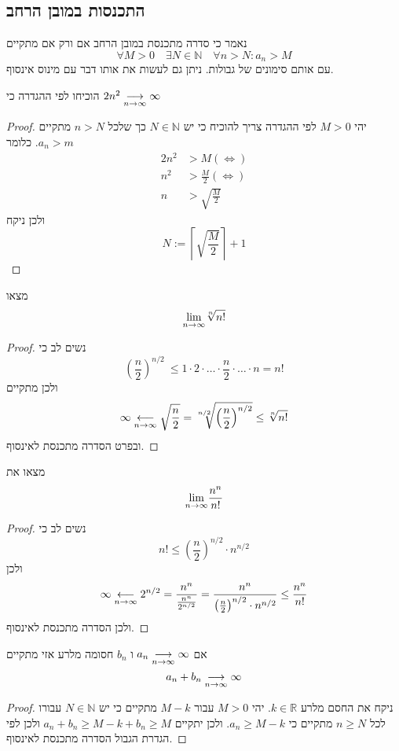 \documentclass{article}
\begin{document}
\subsection*{התכנסות במובן הרחב}
\begin{definition}
נאמר כי סדרה מתכנסת במובן הרחב אם ורק אם מתקיים 
\[\forall M>0 \quad \exists N\in\mathbb{N}\quad \forall n>N: a_n>M\]
עם אותם סימונים של גבולות. ניתן גם לעשות את אותו דבר עם מינוס אינסוף.
\end{definition}
\begin{example}
הוכיחו לפי ההגדרה כי 
$2n^2\underset{n\rightarrow\infty}{\longrightarrow} \infty$
\end{example}

\begin{proof}
יהי 
$M>0$
לפי ההגדרה צריך להוכיח כי יש 
$N\in\mathbb{N}$
כך שלכל 
$n>N$
מתקיים 
$a_n>m$.
כלומר 
\begin{align*}
2n^2&>M  \left(\Longleftrightarrow\right)\\
n^2&>\frac{M}{2}  \left(\Longleftrightarrow\right)\\
n&> \sqrt{\frac{M}{2}} 
\end{align*}
ולכן ניקח 
\[N:=\left\lceil\sqrt{\frac{M}{2}} \right\rceil +1\]
\end{proof}

\begin{comment}
שימו לב כי אם 
$a_n$ 
סדרה מתכנסת לאינסוף ומתקיים כי 
$a_n\leq b_n$
אז גם 
$b_n$
מתכנסת לאינסוף.
\end{comment}
\begin{example}
מצאו 
\[\underset{n\rightarrow\infty}{\lim} \sqrt[n]{n!}\]
\end{example}
\begin{proof}
נשים לב כי 
\[\left(\frac{n}{2}\right)^{n/2}\ \leq 1\cdot 2\cdot \dots\cdot \frac{n}{2}\cdot \dots\cdot n= n!\]
ולכן מתקיים
\[\infty\underset{n\rightarrow\infty}{\longleftarrow} \sqrt{\frac{n}{2}}= \sqrt[n/2]{\left(\frac{n}{2}\right)^{n/2}}\leq \sqrt[n]{n!}\]
ובפרט הסדרה מתכנסת לאינסוף.
\end{proof}
\begin{example}
מצאו את 
\[\underset{n\rightarrow\infty}{\lim} \frac{n^n}{n!}\]
\end{example}
\begin{proof}
נשים לב כי
\[n!\leq \left(\frac{n}{2}\right)^{n/2}\cdot n ^{n/2}\]
ולכן 
\[\infty\underset{n\rightarrow\infty}{\longleftarrow} 2^{n/2} = \frac{n^n}{\frac{n^n}{2^{n/2}}} = \frac{n^n}{\left(\frac{n}{2}\right)^{n/2}\cdot n^{n/2}} \leq \frac{n^n}{n!} \]
ולכן הסדרה מתכנסת לאינסוף. 
\end{proof}

\begin{claim}
אם 
$a_n\underset{n\rightarrow\infty}{\longrightarrow} \infty$
ו 
$b_n$
חסומה מלרע אזי מתקיים 
\[a_n+b_n\underset{n\rightarrow\infty}{\longrightarrow}\infty\]
\end{claim}
\begin{proof}
ניקח את החסם מלרע 
$k\in\mathbb{R}$.
יהי 
$M>0$
עבור 
$M-k$
מתקיים כי יש 
$N\in\mathbb{N}$
 עבורו לכל
$n\geq N$
 מתקיים כי
$a_n\geq M-k$. ולכן יתקיים 
$a_n+b_n\geq M-k +b_n\geq M$
ולכן לפי הגדרת הגבול הסדרה מתכנסת לאינסוף.
\end{proof}
\end{document}
